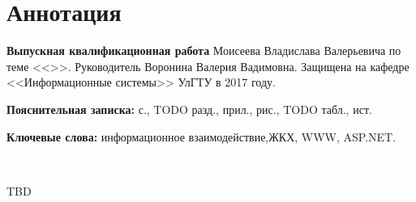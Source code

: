 
\section*{Аннотация}

\textbf{Выпускная квалификационная работа} Моисеева Владислава Валерьевича по теме <<\WorkName>>.
Руководитель Воронина Валерия Вадимовна.
Защищена на кафедре <<Информационные системы>> УлГТУ в 2017 году.

\textbf{Пояснительная записка:}  с., TODO разд.,  прил.,  рис., TODO табл.,  ист.

\textbf{Ключевые слова:} информационное взаимодействие,\linebreak ЖКХ, WWW, ASP.NET. 

~

TBD

\clearpage
\newpage